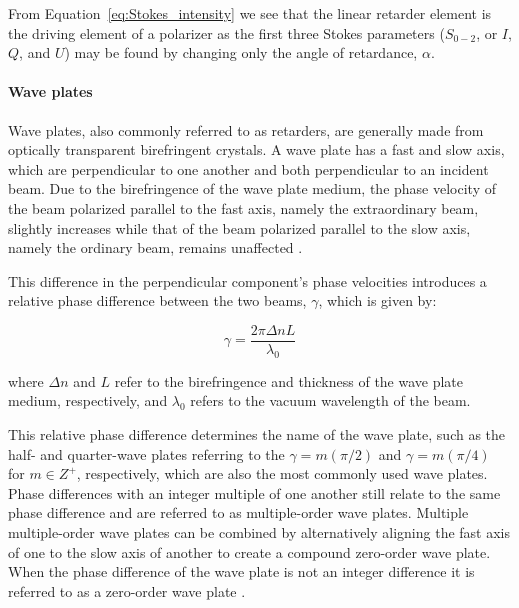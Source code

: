 From Equation~\ref{eq:Stokes_intensity} we see that the linear retarder element is the driving element of a polarizer as the first three Stokes parameters ($S_{0-2}$, or $I$, $Q$, and $U$) may be found by changing only the angle of retardance, $\alpha$.

\paragraph{Wave plates}
Wave plates, also commonly referred to as retarders, are generally made from optically transparent birefringent crystals. A wave plate has a fast and slow axis, which are perpendicular to one another and both perpendicular to an incident beam. Due to the birefringence of the wave plate medium, the phase velocity of the beam polarized parallel to the fast axis, namely the extraordinary beam, slightly increases while that of the beam polarized parallel to the slow axis, namely the ordinary beam, remains unaffected \citep{Hecht_optics}.
\prgph

This difference in the perpendicular component's phase velocities introduces a relative phase difference between the two beams, $\gamma$, which is given by:

\begin{equation}
  \gamma = \frac{2 \pi \Delta n L}{\lambda_{0}}
\end{equation}

\noindent where $\Delta n$ and $L$ refer to the birefringence and thickness of the wave plate medium, respectively, and $\lambda_{0}$ refers to the vacuum wavelength of the beam.
\prgph

This relative phase difference determines the name of the wave plate, such as the half- and quarter-wave plates referring to the $\gamma = m(\pi/2) $ and $\gamma = m(\pi/4)$ for $m \in Z^{+}$, respectively, which are also the most commonly used wave plates. Phase differences with an integer multiple of one another still relate to the same phase difference and are referred to as multiple-order wave plates. Multiple multiple-order wave plates can be combined by alternatively aligning the fast axis of one to the slow axis of another to create a compound zero-order wave plate. When the phase difference of the wave plate is not an integer difference it is referred to as a zero-order wave plate \citep{Hale_birefringence}.

